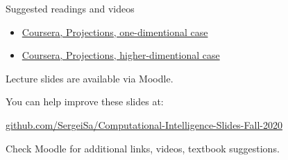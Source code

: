 \documentclass{beamer}
\begin{document}
\begin{frame}{Suggested readings and videos}
\begin{flushleft}

\begin{itemize}
    \item \href{https://www.coursera.org/learn/pca-machine-learning/lecture/2WGJu/projection-onto-1d-subspaces}{Coursera, Projections, one-dimentional case}
    \item \href{https://www.coursera.org/learn/pca-machine-learning/lecture/4Chtk/projections-onto-higher-dimensional-subspaces}{Coursera, Projections, higher-dimentional case}
\end{itemize}

\end{flushleft}
\end{frame}



\begin{frame}
\centerline{Lecture slides are available via Moodle.}
\bigskip
\centerline{You can help improve these slides at:}

\centerline{\href{https://github.com/SergeiSa/Computational-Intelligence-Slides-Fall-2020}{github.com/SergeiSa/Computational-Intelligence-Slides-Fall-2020}}


\bigskip
\centerline{Check Moodle for additional links, videos, textbook suggestions.}
\end{frame}
\end{document}
